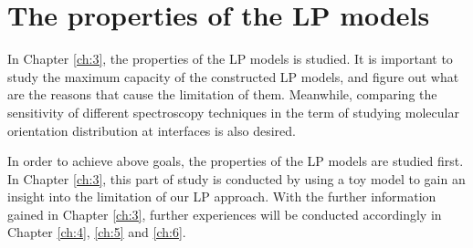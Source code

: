 \section{The properties of the LP models}

In Chapter \ref{ch:3}, the properties of the LP models is studied. It is important to study the maximum capacity of the constructed LP models, and figure out what are the reasons that cause the limitation of them. Meanwhile, comparing the sensitivity of different spectroscopy techniques in the term of studying molecular orientation distribution at interfaces is also desired.

In order to achieve above goals, the properties of the LP models are studied first. In Chapter \ref{ch:3}, this part of study is conducted by using a toy model to gain an insight into the limitation of our LP approach. With the further information gained in Chapter \ref{ch:3}, further experiences will be conducted accordingly in Chapter \ref{ch:4}, \ref{ch:5} and \ref{ch:6}.




